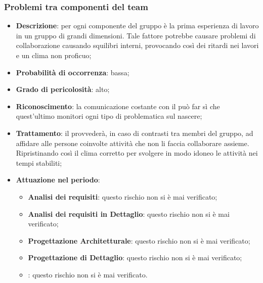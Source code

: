 		\subsubsection{Problemi tra componenti del team}
		\begin{itemize}
			\item \textbf{Descrizione}: per ogni componente del gruppo è la prima esperienza di lavoro in un gruppo di grandi dimensioni. Tale fattore potrebbe causare problemi di collaborazione causando squilibri interni, provocando così dei ritardi nei lavori e un clima non proficuo; 
			\item \textbf{Probabilità di occorrenza}: bassa;
			\item \textbf{Grado di pericolosità}: alto;
			\item \textbf{Riconoscimento}: la comunicazione costante con il \textit{\Res} può far sì che quest'ultimo monitori ogni tipo di problematica sul nascere;  
			\item \textbf{Trattamento}: il \textit{\Res} provvederà, in caso di contrasti tra membri del gruppo, ad affidare alle persone coinvolte attività che non li faccia collaborare assieme. Ripristinando così il clima corretto per svolgere in modo idoneo le attività nei tempi stabiliti;
			\item \textbf{Attuazione nel periodo}:
			\begin{itemize}
				\item \textbf{Analisi dei requisiti}: questo rischio non si è mai verificato;
				\item \textbf{Analisi dei requisiti in Dettaglio}: questo rischio non si è mai verificato;
				\item \textbf{Progettazione Architetturale}: questo rischio non si è mai verificato;
				\item \textbf{Progettazione di Dettaglio}: questo rischio non si è mai verificato;
				\item \textbf{\CO}: questo rischio non si è mai verificato.
			\end{itemize}
		\end{itemize}
		
